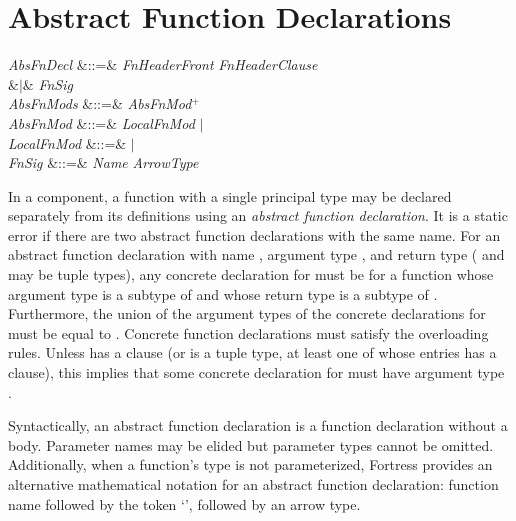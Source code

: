\section{Abstract Function Declarations}
\begin{Grammar}
\emph{AbsFnDecl} &::=&  \emph{FnHeaderFront}
\emph{FnHeaderClause}\\
&$|$& \emph{FnSig} \\

\emph{AbsFnMods} &::=& \emph{AbsFnMod}$^+$\\

\emph{AbsFnMod} &::=& \emph{LocalFnMod} $|$ \\

\emph{LocalFnMod} &::=&  $|$ \\

\emph{FnSig} &::=& \emph{Name} \EXP{\mathrel{\mathtt{:}}} \emph{ArrowType}\\
\end{Grammar}

In a component, a function with a single principal type may be declared separately from its
definitions using an \emph{abstract function declaration}.  It is a static
error if there are two abstract function declarations with the same name.
For an abstract function declaration with name , argument type
, and return type  ( and  may be tuple types),
any concrete declaration for  must be for a function whose argument
type is a subtype of  and whose return type is a subtype of .
Furthermore, the union of the argument types of the concrete declarations for
 must be equal to .
Concrete function declarations must satisfy the overloading rules.
Unless  has a  clause (or is a tuple type, at least
one of whose entries has a  clause), this implies that some
concrete declaration for  must have argument type .

Syntactically, an abstract function declaration is a function declaration
without a body.  Parameter names may be elided but parameter types cannot
be omitted.  Additionally, when a function's type is not parameterized,
Fortress provides an alternative mathematical notation for
an abstract function declaration: function name followed by the token
`\EXP{\COLONOP}', followed by an arrow type.

